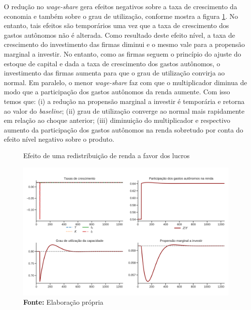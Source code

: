 O redução no \textit{wage-share} gera efeitos negativos sobre a taxa de crescimento da economia e também sobre o grau de utilização, conforme mostra a figura \ref{choque_2}. No entanto, tais efeitos são temporários uma vez que a taxa de crescimento dos gastos autônomos não é alterada. 
Como resultado deste efeito nível, a taxa de crescimento do investimento das firmas diminui e o mesmo vale para a propensão marginal a investir.
No entanto, como as firmas seguem o princípio do ajuste do estoque de capital e dada a taxa de crescimento dos gastos autônomos, o investimento das firmas aumenta para que o grau de utilização convirja ao normal.
Em paralelo, o menor \textit{wage-share} faz com que o multiplicador diminua de modo que a participação dos gastos autônomos da renda aumente.
Com isso temos que: (i) a redução na propensão marginal a investir é temporária e retorna ao valor do \textit{baseline}; (ii) grau de utilização converge ao normal mais rapidamente em relação ao choque anterior; (iii) diminuição do multiplicador e respectivo aumento da participação dos gastos autônomos na renda sobretudo por conta do efeito nível negativo sobre o produto.


\begin{figure}[H]
	\centering
	\caption{Efeito de uma redistribuição de renda a favor dos lucros}
	\label{choque_2}
	\includegraphics[width=\textwidth]{../../Modelo/Versoes/Shock_2.png}
	\caption*{\textbf{Fonte:} Elaboração própria}
\end{figure}


